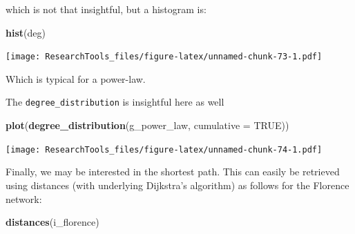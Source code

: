 \documentclass[]{article}
\newenvironment{Shaded}{\begin{snugshade}}{\end{snugshade}}
\newcommand{\KeywordTok}[1]{\textcolor[rgb]{0.13,0.29,0.53}{\textbf{#1}}}
\newcommand{\DataTypeTok}[1]{\textcolor[rgb]{0.13,0.29,0.53}{#1}}
\newcommand{\OtherTok}[1]{\textcolor[rgb]{0.56,0.35,0.01}{#1}}
\newcommand{\NormalTok}[1]{#1}
\theoremstyle{definition}
\theoremstyle{definition}
\theoremstyle{definition}
\theoremstyle{remark}
\begin{document}
which is not that insightful, but a histogram is:

\begin{Shaded}
\begin{Highlighting}[]
 \KeywordTok{hist}\NormalTok{(deg)}
\end{Highlighting}
\end{Shaded}

\texttt{[image: ResearchTools\_files/figure-latex/unnamed-chunk-73-1.pdf]}

Which is typical for a power-law.

The \texttt{degree\_distribution} is insightful here as well

\begin{Shaded}
\begin{Highlighting}[]
\KeywordTok{plot}\NormalTok{(}\KeywordTok{degree_distribution}\NormalTok{(g_power_law, }\DataTypeTok{cumulative =} \OtherTok{TRUE}\NormalTok{))}
\end{Highlighting}
\end{Shaded}

\texttt{[image: ResearchTools\_files/figure-latex/unnamed-chunk-74-1.pdf]}

Finally, we may be interested in the shortest path. This can easily be
retrieved using distances (with underlying Dijkstra's algorithm) as
follows for the Florence network:

\begin{Shaded}
\begin{Highlighting}[]
\KeywordTok{distances}\NormalTok{(i_florence)}
\end{Highlighting}
\end{Shaded}
\end{document}
